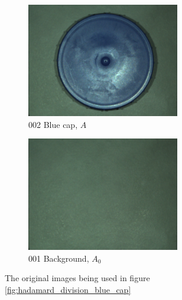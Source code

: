 \begin{figure}[h]
    \begin{subfigure}{0.5\textwidth}
        \includegraphics[width=0.9\linewidth, height=5cm]{figures/camera_pictures_png/002_blue_cap.png}
        \caption{002 Blue cap, $A$}
        \label{fig:002_blue_cap}
    \end{subfigure}%
    \begin{subfigure}{0.5\textwidth}
        \includegraphics[width=0.9\linewidth, height=5cm]{figures/camera_pictures_png/001_background.png}
        \caption{001 Background, $A_0$}
        \label{fig:001_background}
    \end{subfigure}
    
    \caption{The original images being used in figure \ref{fig:hadamard_division_blue_cap}}
    \label{fig:blue_cap_and_background}
\end{figure}

